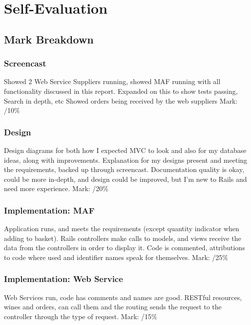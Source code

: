 \documentclass[12pt]{article}
\begin{document}

\section{Self-Evaluation}
\subsection{Mark Breakdown}
\subsubsection{Screencast}
Showed 2 Web Service Suppliers running, showed MAF running with all functionality discussed in this report. Expanded on this to show tests passing, Search in depth, etc Showed orders being received by the web suppliers
Mark: /10\%

\subsubsection{Design}
Design diagrams for both how I expected MVC to look and also for my database ideas, along with improvements. Explanation for my designs present and meeting the requirements, backed up through screencast. Documentation quality is okay, could be more in-depth, and design could be improved, but I'm new to Rails and need more experience.
Mark: /20\%

\subsubsection{Implementation: MAF}
Application runs, and meets the requirements (except quantity indicator when adding to basket). Rails controllers make calls to models, and views receive the data from the controllers in order to display it. Code is commented, attributions to code where used and identifier names speak for themselves.
Mark: /25\%

\subsubsection{Implementation: Web Service}
Web Services run, code has comments and names are good. RESTful resources, wines and orders, can call them and the routing sends the request to the controller through the type of request.
Mark: /15\%
\end{document}
